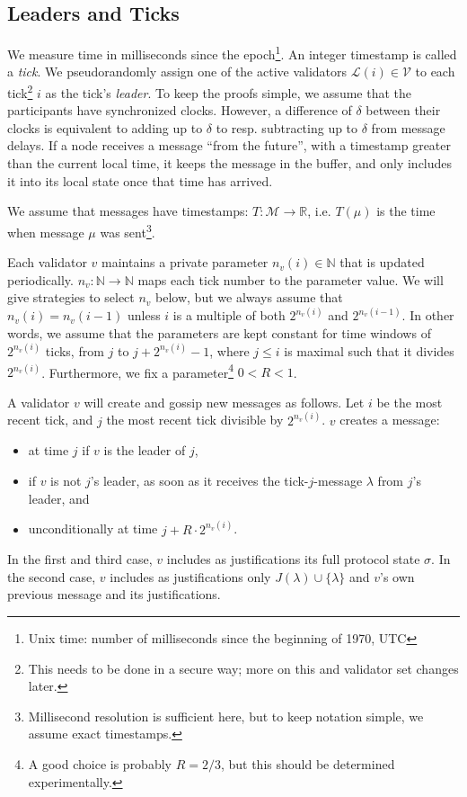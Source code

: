 \documentclass[12pt]{article}
\begin{document}
\subsection{Leaders and Ticks}

We measure time in milliseconds since the epoch\footnote{Unix time: number of milliseconds since the beginning of 1970, UTC}. An integer timestamp is called a \emph{tick}. We pseudorandomly assign one of the active validators $\mathcal{L}(i) \in \mathcal{V}$ to each tick\footnote{This needs to be done in a secure way; more on this and validator set changes later.} $i$ as the tick's \emph{leader}. To keep the proofs simple, we assume that the participants have synchronized clocks. However, a difference of $\delta$ between their clocks is equivalent to adding up to $\delta$ to resp. subtracting up to $\delta$ from message delays. If a node receives a message ``from the future'', with a timestamp greater than the current local time, it keeps the message in the buffer, and only includes it into its local state once that time has arrived.

We assume that messages have timestamps: $T: \mathcal{M} \rightarrow \mathbb{R}$, i.e. $T(\mu)$ is the time when message $\mu$ was sent\footnote{Millisecond resolution is sufficient here, but to keep notation simple, we assume exact timestamps.}.

Each validator $v$ maintains a private parameter $n_v(i) \in \mathbb{N}$ that is updated periodically. $n_v: \mathbb{N} \rightarrow \mathbb{N}$ maps each tick number to the parameter value. We will give strategies to select $n_v$ below, but we always assume that $n_v (i) = n_v (i - 1)$ unless $i$ is a multiple of both $2^{n_v(i)}$ and $2^{n_v(i-1)}$. In other words, we assume that the parameters are kept constant for time windows of $2^{n_v(i)}$ ticks, from $j$ to $j + 2^{n_v(i)} - 1$, where $j \leq i$ is maximal such that it divides $2^{n_v(i)}$. Furthermore, we fix a parameter\footnote{A good choice is probably $R = 2/3$, but this should be determined experimentally.} $0 < R < 1$.

A validator $v$ will create and gossip new messages as follows. Let $i$ be the most recent tick, and $j$ the most recent tick divisible by $2^{n_v(i)}$. $v$ creates a message:
\begin{itemize}
    \item at time $j$ if $v$ is the leader of $j$,
    \item if $v$ is not $j$'s leader, as soon as it receives the tick-$j$-message $\lambda$ from $j$'s leader, and
    \item unconditionally at time $j + R \cdot 2^{n_v(i)}$.
\end{itemize}
In the first and third case, $v$ includes as justifications its full protocol state $\sigma$. In the second case, $v$ includes as justifications only $J(\lambda) \cup \{\lambda\}$ and $v$'s own previous message and its justifications.
\end{document}

